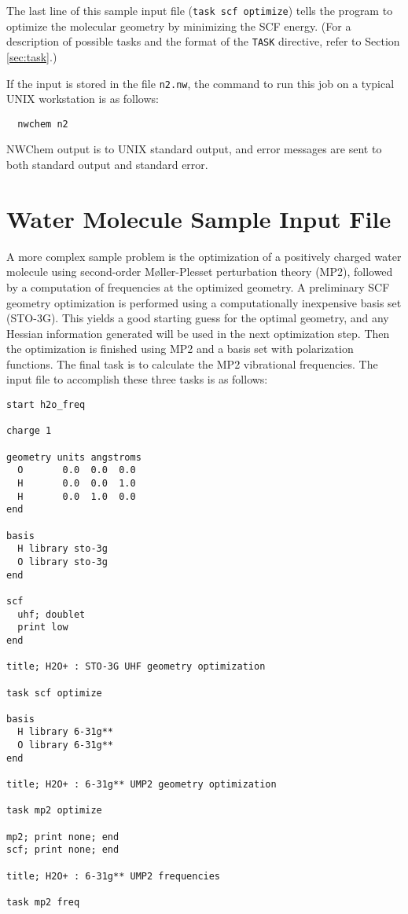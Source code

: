 The last line of this sample input file ({\tt task scf optimize})
tells the program to optimize the molecular geometry by minimizing
the SCF energy.  (For a description of possible tasks and the format
of the \verb+TASK+ directive, refer to Section \ref{sec:task}.)

If the input is stored in the file \verb+n2.nw+, the command to run
this job on a typical UNIX workstation is as follows:

\begin{verbatim}
  nwchem n2
\end{verbatim}

NWChem output is to UNIX standard output, and error messages are sent to
both standard output and standard error.

\section{Water Molecule Sample Input File}
\label{sec:realsample}

A more complex sample problem is the optimization of a positively
charged water molecule using second-order M{\o}ller-Plesset
perturbation theory (MP2), followed by a computation of frequencies at
the optimized geometry.  A preliminary SCF geometry optimization is
performed using a computationally inexpensive basis set (STO-3G).
This yields a good starting guess for the optimal geometry, and any
Hessian information generated will be used in the next optimization
step.  Then the optimization is finished using MP2 and a basis set
with polarization functions.  The final task is to calculate the
MP2 vibrational frequencies.  The input file to accomplish these three
tasks is as follows:

\begin{verbatim}
start h2o_freq

charge 1

geometry units angstroms
  O       0.0  0.0  0.0
  H       0.0  0.0  1.0
  H       0.0  1.0  0.0
end

basis
  H library sto-3g
  O library sto-3g
end

scf
  uhf; doublet
  print low
end

title; H2O+ : STO-3G UHF geometry optimization

task scf optimize

basis
  H library 6-31g**
  O library 6-31g**
end

title; H2O+ : 6-31g** UMP2 geometry optimization

task mp2 optimize

mp2; print none; end
scf; print none; end

title; H2O+ : 6-31g** UMP2 frequencies

task mp2 freq
\end{verbatim}

